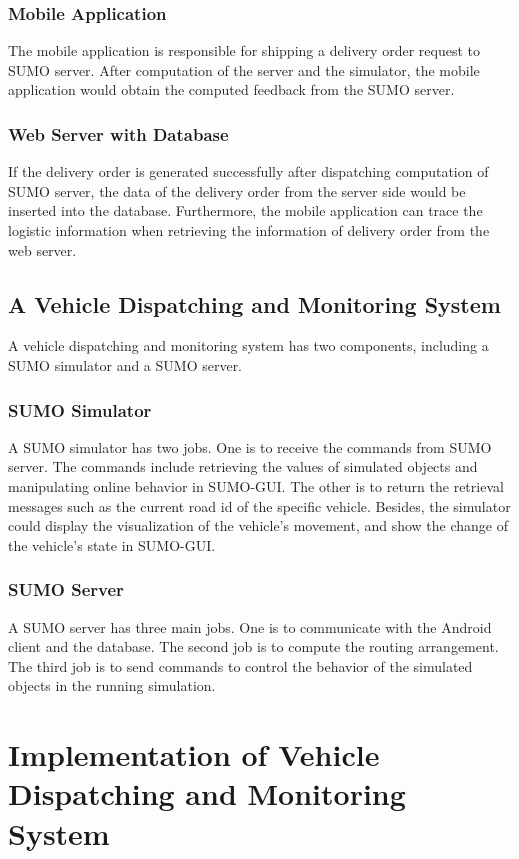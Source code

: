 \documentclass[12pt]{ksthesis}
\begin{document}
\begin{thesis}
{\subsection{Mobile Application}
The mobile application is responsible for shipping a delivery order request to SUMO server. After computation of the server and the simulator, the mobile application would obtain the computed feedback from the SUMO server.

\subsection{Web Server with Database}
If the delivery order is generated successfully after dispatching computation of SUMO server, the data of the delivery order from the server side would be inserted into the database. Furthermore, the mobile application can trace the logistic information when retrieving the information of delivery order from the web server.

\section{A Vehicle Dispatching and Monitoring System}
A vehicle dispatching and monitoring system has two components, including a SUMO simulator and a SUMO server.



\subsection{SUMO Simulator}
A SUMO simulator has two jobs. One is to receive the commands from SUMO server. The commands include retrieving the values of simulated objects and manipulating online behavior in SUMO-GUI. The other is to return the retrieval messages such as the current road id of the specific vehicle. Besides, the simulator could display the visualization of the vehicle’s movement, and show the change of the vehicle’s state in SUMO-GUI.

\subsection{SUMO Server}
A SUMO server has three main jobs. One is to communicate with the Android client and the database. The second job is to compute the routing arrangement. The third job is to send commands to control the behavior of the simulated objects in the running simulation.

\chapter{Implementation of Vehicle Dispatching and Monitoring System }\label{Chap:Architecture}

}
\end{thesis}
\end{document}
